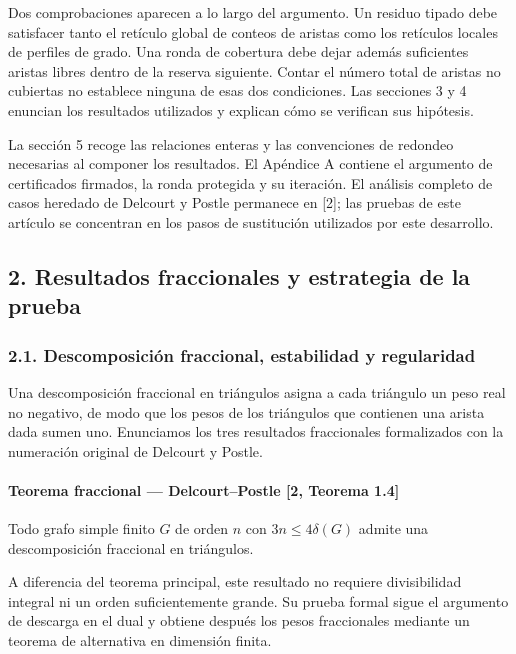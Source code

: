 \documentclass[spanish,11pt,a4paper]{article}
\begin{document}
Dos comprobaciones aparecen a lo largo del argumento. Un residuo tipado debe satisfacer tanto el retículo global de conteos de aristas como los retículos locales de perfiles de grado. Una ronda de cobertura debe dejar además suficientes aristas libres dentro de la reserva siguiente. Contar el número total de aristas no cubiertas no establece ninguna de esas dos condiciones. Las secciones 3 y 4 enuncian los resultados utilizados y explican cómo se verifican sus hipótesis.

La sección 5 recoge las relaciones enteras y las convenciones de redondeo necesarias al componer los resultados. El Apéndice A contiene el argumento de certificados firmados, la ronda protegida y su iteración. El análisis completo de casos heredado de Delcourt y Postle permanece en {[}2{]}; las pruebas de este artículo se concentran en los pasos de sustitución utilizados por este desarrollo.


\subsection{2. Resultados fraccionales y estrategia de la prueba}\label{resultados-fraccionales-y-estrategia-de-la-prueba}

\subsubsection{2.1. Descomposición fraccional, estabilidad y regularidad}\label{descomposiciuxf3n-fraccional-estabilidad-y-regularidad}

Una descomposición fraccional en triángulos asigna a cada triángulo un peso real no negativo, de modo que los pesos de los triángulos que contienen una arista dada sumen uno. Enunciamos los tres resultados fraccionales formalizados con la numeración original de Delcourt y Postle.

\paragraph{Teorema fraccional --- Delcourt--Postle {[}2, Teorema 1.4{]}}\label{teorema-fraccional-delcourtpostle-2-teorema-1.4}

Todo grafo simple finito \(G\) de orden \(n\) con \(3n\le4\delta(G)\) admite una descomposición fraccional en triángulos.

A diferencia del teorema principal, este resultado no requiere divisibilidad integral ni un orden suficientemente grande. Su prueba formal sigue el argumento de descarga en el dual y obtiene después los pesos fraccionales mediante un teorema de alternativa en dimensión finita.
\end{document}
